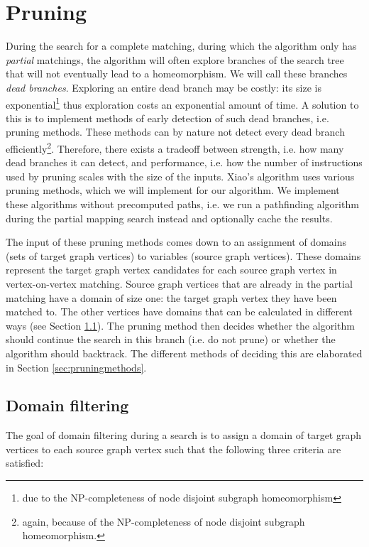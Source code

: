 \chapter{Pruning}
\label{chapter:pruning}

During the search for a complete matching, during which the algorithm only has \textit{partial} matchings, the algorithm will often explore branches of the search tree that will not eventually lead to a homeomorphism. We will call these branches \textit{dead branches}. Exploring an entire dead branch may be costly: its size is exponential\footnote{due to the NP-completeness of node disjoint subgraph homeomorphism} thus exploration costs an exponential amount of time. A solution to this is to implement methods of early detection of such dead branches, i.e. pruning methods. These methods can by nature not detect every dead branch efficiently\footnote{again, because of the NP-completeness of node disjoint subgraph homeomorphism.}. Therefore, there exists a tradeoff between strength, i.e. how many dead branches it can detect, and performance, i.e. how the number of instructions used by pruning scales with the size of the inputs. Xiao's algorithm uses various pruning methods, which we will implement for our algorithm. We implement these algorithms without precomputed paths, i.e. we run a pathfinding algorithm during the partial mapping search instead and optionally cache the results.

The input of these pruning methods comes down to an assignment of domains (sets of target graph vertices) to variables (source graph vertices). These domains represent the target graph vertex candidates for each source graph vertex in vertex-on-vertex matching. Source graph vertices that are already in the partial matching have a domain of size one: the target graph vertex they have been matched to. The other vertices have domains that can be calculated in different ways (see Section \ref{sec:domain-filtering}). The pruning method then decides whether the algorithm should continue the search in this branch (i.e. do not prune) or whether the algorithm should backtrack. The different methods of deciding this are elaborated in Section \ref{sec:pruningmethods}.

\section{Domain filtering}
\label{sec:domain-filtering}
The goal of domain filtering during a search is to assign a domain of target graph vertices to each source graph vertex such that the following three criteria are satisfied:

